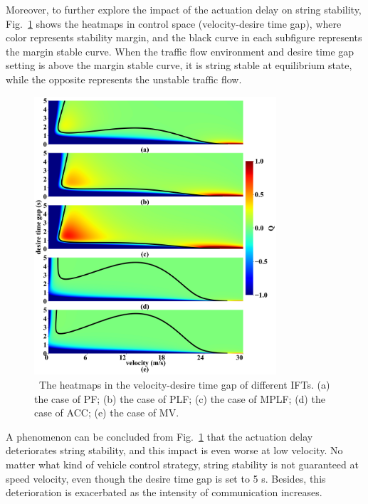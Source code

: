 \documentclass[journal]{IEEEtran}
\begin{document}
Moreover, to further explore the impact of the actuation delay on string stability, Fig.~\ref{fig_actuation_1} shows the heatmaps in control space (velocity-desire time gap), where color represents stability margin, and the black curve in each subfigure represents the margin stable curve. When the traffic flow environment and desire time gap setting is above the margin stable curve, it is string stable at equilibrium state, while the opposite represents the unstable traffic flow.

\begin{figure}
  \includegraphics[width=9cm]{fig_actuation.png}
  \caption{~The heatmaps in the velocity-desire time gap of different IFTs. (a) the case of PF; (b) the case of PLF; (c) the case of MPLF; (d) the case of ACC; (e) the case of MV.}
  \label{fig_actuation_1}
\end{figure}

A phenomenon can be concluded from Fig.~\ref{fig_actuation_1} that the actuation delay deteriorates string stability, and this impact is even worse at low velocity. No matter what kind of vehicle control strategy, string stability is not guaranteed at speed velocity, even though the desire time gap is set to 5 s. Besides, this deterioration is exacerbated as the intensity of communication increases.
\end{document}
